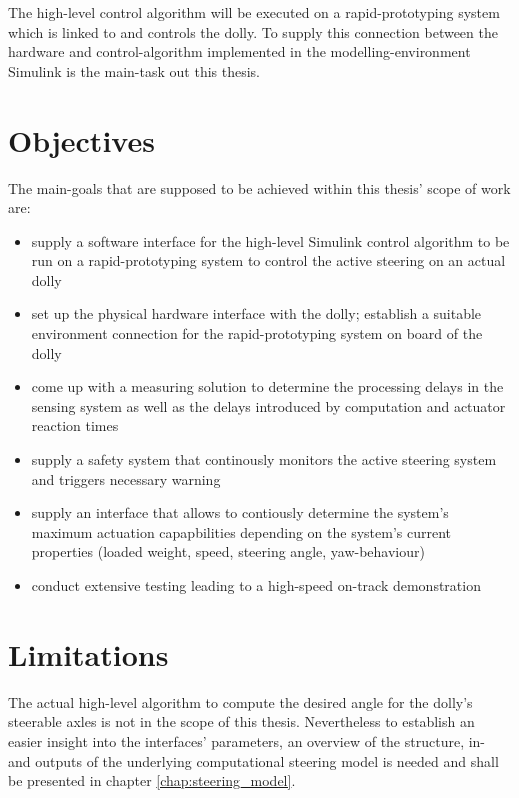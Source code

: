 \documentclass[ExampleMasters.tex]{subfiles}
\begin{document}
The high-level control algorithm will be executed on a rapid-prototyping system which is linked to and controls the dolly. To supply this connection between the hardware and control-algorithm implemented in the modelling-environment Simulink is the main-task out this thesis.   

\section{Objectives}
\label{sec:objectives}
The main-goals that are supposed to be achieved within this thesis' scope of work are: 

\begin{itemize}
	\item{supply a software interface for the high-level Simulink control algorithm to be run on a rapid-prototyping system to control the active steering on an actual dolly}
	\item{set up the physical hardware interface with the dolly; establish a suitable environment connection for the rapid-prototyping system on board of the dolly} 
	\item{come up with a measuring solution to determine the processing delays in the sensing system as well as the delays introduced by computation and actuator reaction times}  
	\item{supply a safety system that continously monitors the active steering system and triggers necessary warning}
	\item{supply an interface that allows to contiously determine the system's maximum actuation capapbilities depending on the system's current properties (loaded weight, speed, steering angle, yaw-behaviour) }
	\item{conduct extensive testing leading to a high-speed on-track demonstration}
	
\end{itemize}



\section{Limitations}
\label{sec:limitations}
The actual high-level algorithm to compute the desired angle for the dolly's steerable axles is not in the scope of this thesis. Nevertheless to establish an easier insight into the interfaces' parameters, an overview of the structure, in- and outputs of the underlying computational steering model is needed and shall be presented in chapter \ref{chap:steering_model}. 
\end{document}
